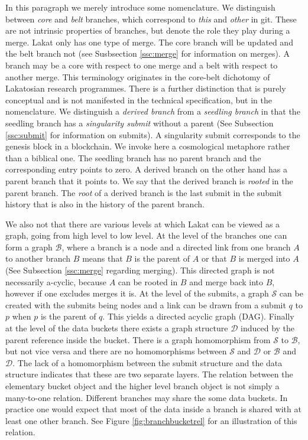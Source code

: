 \documentclass[14pt]{article}
\begin{document}
In this paragraph we merely introduce some nomenclature. We distinguish between \textit{core} and \textit{belt} branches, which correspond to \textit{this} and \textit{other} in git. These are not intrinsic properties of branches, but denote the role they play during a merge. Lakat only has one type of merge. The core branch will be updated and the belt branch not (see Susbsection \ref{ssc:merge} for information on merges). A branch may be a core with respect to one merge and a belt with respect to another merge. This terminology originates in the core-belt dichotomy of Lakatosian research programmes. There is a further distinction that is purely conceptual and is not manifested in the technical specification, but in the nomenclature. We distinguish a \textit{derived branch} from a \textit{seedling branch} in that the seedling branch has a \textit{singularity submit} without a parent (See Subsection \ref{ssc:submit} for information on submits). A singularity submit corresponds to the genesis block in a blockchain. We invoke here a cosmological metaphore rather than a biblical one. The seedling branch has no parent branch and the corresponding entry points to zero. A derived branch on the other hand has a parent branch that it points to. We say that the derived branch is \textit{rooted} in the parent branch. The \textit{root} of a derived branch is the last submit in the submit history that is also in the history of the parent branch.

We also not that there are various levels at which Lakat can be viewed as a graph, going from high level to low level. At the level of the branches one can form a graph $\mathcal B$, where a branch is a node and a directed link from one branch $A$ to another branch $B$ means that $B$ is the parent of $A$ or that $B$ is merged into $A$ (See Subsection \ref{ssc:merge} regarding merging). This directed graph is not necessarily a-cyclic, because $A$ can be rooted in $B$ and merge back into $B$, however if one excludes merges it is. At the level of the submits, a graph $\mathcal S$ can be created with the submits being nodes and a link can be drawn from a submit $q$ to $p$ when $p$ is the parent of $q$. This yields a directed acyclic graph (DAG). Finally at the level of the data buckets there exists a graph structure $\mathcal D$ induced by the parent reference inside the bucket. There is a graph homomorphism from $\mathcal S$ to $\mathcal B$, but not vice versa and there are no homomorphisms between $\mathcal S$ and $\mathcal D$ or $\mathcal B$ and $\mathcal D$. The lack of a homomorphism between the submit structure and the data structure indicates that these are two separate layers. The relation between the elementary bucket object and the higher level branch object is not simply a many-to-one relation. Different branches may share the some data buckets. In practice one would expect that most of the data inside a branch is shared with at least one other branch. See Figure \ref{fig:branchbucketrel} for an illustration of this relation.
\end{document}
